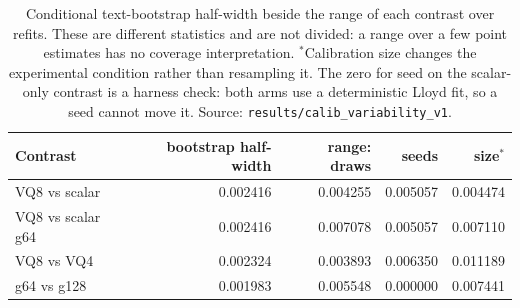 \begin{table}[t]
\centering
\small
\begin{tabular}{lrrrr}
\toprule
Contrast & bootstrap half-width & range: draws & seeds & size$^{*}$ \\
\midrule
VQ8 vs scalar & 0.002416 & 0.004255 & 0.005057 & 0.004474 \\
VQ8 vs scalar g64 & 0.002416 & 0.007078 & 0.005057 & 0.007110 \\
VQ8 vs VQ4 & 0.002324 & 0.003893 & 0.006350 & 0.011189 \\
g64 vs g128 & 0.001983 & 0.005548 & 0.000000 & 0.007441 \\
\bottomrule
\end{tabular}
\caption{Conditional text-bootstrap half-width beside the range of each contrast over refits. These are different statistics and are not divided: a range over a few point estimates has no coverage interpretation. $^{*}$Calibration size changes the experimental condition rather than resampling it. The zero for seed on the scalar-only contrast is a harness check: both arms use a deterministic Lloyd fit, so a seed cannot move it. Source: \texttt{results/calib\_variability\_v1}.}
\label{tab:refit}
\end{table}
